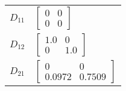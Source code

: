 \begin{tabular}{cl}
 $D_{11}$ & $\left[\begin{matrix}0 & 0\\0 & 0\end{matrix}\right]$                                                                                                                                                                                                                                                                                                                                                                                                                                                                                                                                                                 \\
 $D_{12}$ & $\left[\begin{matrix}1.0 & 0\\0 & 1.0\end{matrix}\right]$                                                                                                                                                                                                                                                                                                                                                                                                                                                                                                                                                             \\
 $D_{21}$ & $\left[\begin{matrix}0 & 0\\0.0972 & 0.7509\end{matrix}\right]$                                                                                                                                                                                                                                                                                                                                                                                                                                                                                                                                                       \\
\hline
\end{tabular}